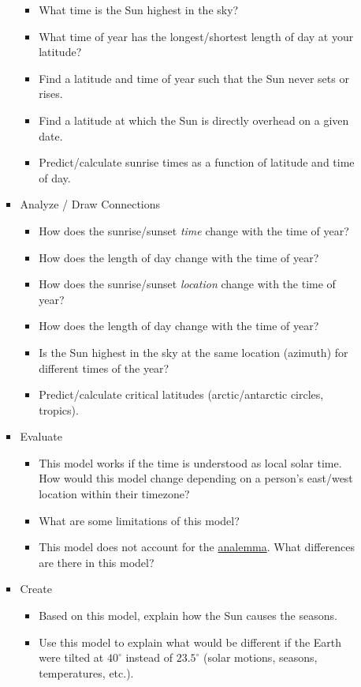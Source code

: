 \documentclass[tikz]{article}
\newif\ifPrintWishlist  %
\begin{document}
\begin{itemize}
\begin{itemize}
\begin{itemize}
\begin{itemize}
					\item What time is the Sun highest in the sky? 
					\item What time of year has the longest/shortest length of day at your latitude?
					\item Find a latitude and time of year such that the Sun never sets or rises.
					\item Find a latitude at which the Sun is directly overhead on a given date.
					\item Predict/calculate sunrise times as a function of latitude and time of day. 
				\end{itemize}
				\item Analyze / Draw Connections
				\begin{itemize}
					\item How does the sunrise/sunset \emph{time} change with the time of year? 
					\item How does the length of day change with the time of year? 
					\item How does the sunrise/sunset \emph{location} change with the time of year? 
					\item How does the length of day change with the time of year? 
					\item Is the Sun highest in the sky at the same location (azimuth) for different times of the year? {\color{red}{(Reword)}}
					\item Predict/calculate critical latitudes (arctic/antarctic circles, tropics).
				\end{itemize}
				\item Evaluate
				\begin{itemize}
					\item This model works if the time is understood as local solar time. How would this model change depending on a person's east/west location within their timezone?
					\item What are some limitations of this model? %
					\item This model does not account for the \href{https://en.wikipedia.org/wiki/Analemma}{analemma}. What differences are there in this model? 
				\end{itemize}
				\item Create
				\begin{itemize}
					\item Based on this model, explain how the Sun causes the seasons. 
					\item Use this model to explain what would be different if the Earth were tilted at $40^\circ$ instead of $23.5^\circ$ (solar motions, seasons, temperatures, etc.). 
				\end{itemize}
				
			\end{itemize}
		\end{itemize}
	\end{itemize}

\fi %

\end{document}
